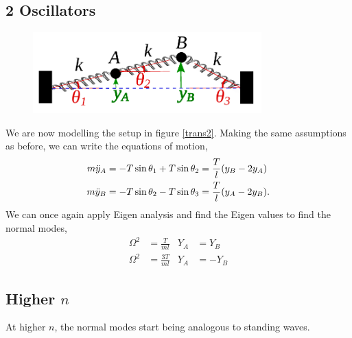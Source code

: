 \documentclass{book}
\begin{document}
\subsection{2 Oscillators}
\begin{figure}
    \centering
    \includegraphics[width=250pt]{trasnverseosc2.pdf}
    \caption{}
    \label{fig:trans2}
\end{figure}
We are now modelling the setup in figure \ref{trans2}. Making the same assumptions as before, we can write the equations of motion,
\begin{align}
    m\Ddot{y}_A & = -T\sin\theta_1 + T\sin\theta_2 = \frac{T}{l}(y_B - 2y_A) \\
    m\Ddot{y}_B & = -T\sin\theta_2 - T\sin\theta_3 = \frac{T}{l}(y_A - 2y_B).
\end{align}
We can once again apply Eigen analysis and find the Eigen values to find the normal modes,
\begin{align}
    \Omega^2 & = \frac{T}{ml} & Y_A & = Y_B \\
    \Omega^2 & = \frac{3T}{ml} & Y_A & = -Y_B
\end{align}
\subsection{Higher $n$}
At higher $n$, the normal modes start being analogous to standing waves.
\end{document}

